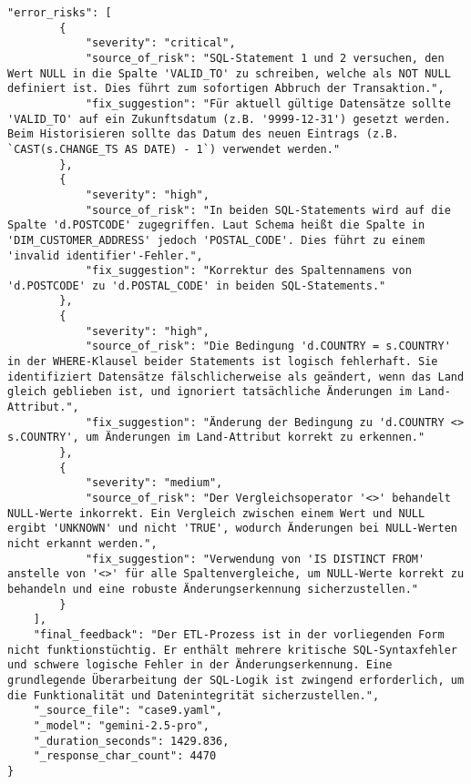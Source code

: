 \begin{lstlisting}[caption={Ausgabe: Gemini 2.5 Pro Anwendungsfall 9 Hauptdurchlauf},label={gemini_case9_prompt1}]
    "error_risks": [
        {
            "severity": "critical",
            "source_of_risk": "SQL-Statement 1 und 2 versuchen, den Wert NULL in die Spalte 'VALID_TO' zu schreiben, welche als NOT NULL definiert ist. Dies führt zum sofortigen Abbruch der Transaktion.",
            "fix_suggestion": "Für aktuell gültige Datensätze sollte 'VALID_TO' auf ein Zukunftsdatum (z.B. '9999-12-31') gesetzt werden. Beim Historisieren sollte das Datum des neuen Eintrags (z.B. `CAST(s.CHANGE_TS AS DATE) - 1`) verwendet werden."
        },
        {
            "severity": "high",
            "source_of_risk": "In beiden SQL-Statements wird auf die Spalte 'd.POSTCODE' zugegriffen. Laut Schema heißt die Spalte in 'DIM_CUSTOMER_ADDRESS' jedoch 'POSTAL_CODE'. Dies führt zu einem 'invalid identifier'-Fehler.",
            "fix_suggestion": "Korrektur des Spaltennamens von 'd.POSTCODE' zu 'd.POSTAL_CODE' in beiden SQL-Statements."
        },
        {
            "severity": "high",
            "source_of_risk": "Die Bedingung 'd.COUNTRY = s.COUNTRY' in der WHERE-Klausel beider Statements ist logisch fehlerhaft. Sie identifiziert Datensätze fälschlicherweise als geändert, wenn das Land gleich geblieben ist, und ignoriert tatsächliche Änderungen im Land-Attribut.",
            "fix_suggestion": "Änderung der Bedingung zu 'd.COUNTRY <> s.COUNTRY', um Änderungen im Land-Attribut korrekt zu erkennen."
        },
        {
            "severity": "medium",
            "source_of_risk": "Der Vergleichsoperator '<>' behandelt NULL-Werte inkorrekt. Ein Vergleich zwischen einem Wert und NULL ergibt 'UNKNOWN' und nicht 'TRUE', wodurch Änderungen bei NULL-Werten nicht erkannt werden.",
            "fix_suggestion": "Verwendung von 'IS DISTINCT FROM' anstelle von '<>' für alle Spaltenvergleiche, um NULL-Werte korrekt zu behandeln und eine robuste Änderungserkennung sicherzustellen."
        }
    ],
    "final_feedback": "Der ETL-Prozess ist in der vorliegenden Form nicht funktionstüchtig. Er enthält mehrere kritische SQL-Syntaxfehler und schwere logische Fehler in der Änderungserkennung. Eine grundlegende Überarbeitung der SQL-Logik ist zwingend erforderlich, um die Funktionalität und Datenintegrität sicherzustellen.",
    "_source_file": "case9.yaml",
    "_model": "gemini-2.5-pro",
    "_duration_seconds": 1429.836,
    "_response_char_count": 4470
}
\end{lstlisting}

